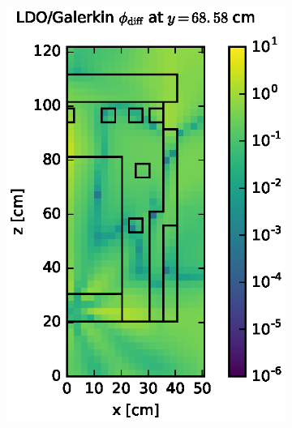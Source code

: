 \begin{figure}[!hbt]
\begin{subfigure}{0.4\textwidth}
\includegraphics[max height=0.445\textheight]
{img/dlvn-plots/fwd/flux-diff-rel-gkn04.eps}
\label{dlvn-fwd-diff-gkn}
\end{subfigure}
\\
\begin{subfigure}{0.4\textwidth}

\end{subfigure}
\end{figure}
